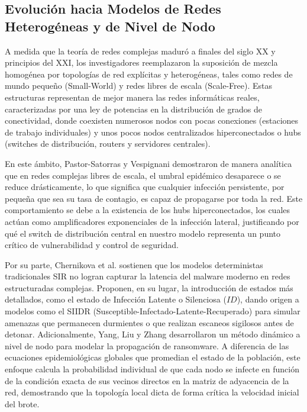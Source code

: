 \subsection{Evolución hacia Modelos de Redes Heterogéneas y de Nivel de Nodo}
A medida que la teoría de redes complejas maduró a finales del siglo XX y principios del XXI, los investigadores reemplazaron la suposición de mezcla homogénea por topologías de red explícitas y heterogéneas, tales como redes de mundo pequeño (Small-World) y redes libres de escala (Scale-Free). Estas estructuras representan de mejor manera las redes informáticas reales, caracterizadas por una ley de potencias en la distribución de grados de conectividad, donde coexisten numerosos nodos con pocas conexiones (estaciones de trabajo individuales) y unos pocos nodos centralizados hiperconectados o hubs (switches de distribución, routers y servidores centrales).

En este ámbito, Pastor-Satorras y Vespignani \cite{pastorsatorras2001epidemic} demostraron de manera analítica que en redes complejas libres de escala, el umbral epidémico desaparece o se reduce drásticamente, lo que significa que cualquier infección persistente, por pequeña que sea su tasa de contagio, es capaz de propagarse por toda la red. Este comportamiento se debe a la existencia de los hubs hiperconectados, los cuales actúan como amplificadores exponenciales de la infección lateral, justificando por qué el switch de distribución central en nuestro modelo representa un punto crítico de vulnerabilidad y control de seguridad.

Por su parte, Chernikova et al. \cite{chernikova2023modeling} sostienen que los modelos deterministas tradicionales SIR no logran capturar la latencia del malware moderno en redes estructuradas complejas. Proponen, en su lugar, la introducción de estados más detallados, como el estado de Infección Latente o Silenciosa ($ID$), dando origen a modelos como el SIIDR (Susceptible-Infectado-Latente-Recuperado) para simular amenazas que permanecen durmientes o que realizan escaneos sigilosos antes de detonar.
Adicionalmente, Yang, Liu y Zhang \cite{yang2019modeling} desarrollaron un método dinámico a nivel de nodo para modelar la propagación de ransomware. A diferencia de las ecuaciones epidemiológicas globales que promedian el estado de la población, este enfoque calcula la probabilidad individual de que cada nodo se infecte en función de la condición exacta de sus vecinos directos en la matriz de adyacencia de la red, demostrando que la topología local dicta de forma crítica la velocidad inicial del brote.

